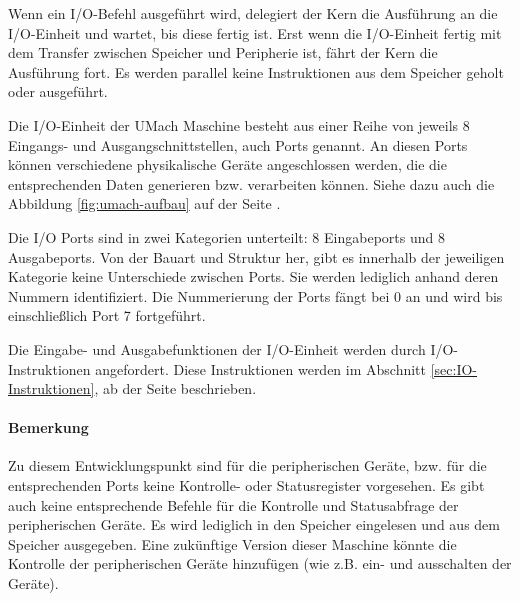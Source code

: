 Wenn ein I/O-Befehl ausgeführt wird, delegiert der Kern die Ausführung an die
I/O-Einheit und wartet, bis diese fertig ist. Erst wenn die I/O-Einheit fertig
mit dem Transfer zwischen Speicher und Peripherie ist, fährt der Kern die
Ausführung fort. Es werden parallel keine Instruktionen aus dem
Speicher geholt oder ausgeführt.


Die I/O-Einheit der UMach Maschine besteht aus einer Reihe von jeweils 8
Eingangs- und Ausgangschnittstellen, auch Ports
genannt. An diesen Ports können verschiedene physikalische Geräte angeschlossen
werden, die die entsprechenden Daten generieren bzw. verarbeiten können. Siehe
dazu auch die Abbildung \ref{fig:umach-aufbau} auf der Seite
\pageref{fig:umach-aufbau}.


Die I/O Ports sind in zwei Kategorien unterteilt: 8 Eingabeports und 8
Ausgabeports. Von der Bauart und Struktur her, gibt es innerhalb der jeweiligen
Kategorie keine Unterschiede zwischen Ports. Sie werden lediglich anhand deren
Nummern identifiziert. Die Nummerierung der Ports fängt bei 0 an und wird bis
einschließlich Port 7 fortgeführt. 


Die Eingabe- und Ausgabefunktionen der I/O-Einheit werden durch
I/O-Instruktionen angefordert. Diese Instruktionen werden im Abschnitt
\ref{sec:IO-Instruktionen}, ab der Seite \pageref{sec:IO-Instruktionen}
beschrieben.


\paragraph{Bemerkung}
Zu diesem Entwicklungspunkt sind für die peripherischen Geräte, bzw. für die
entsprechenden Ports keine Kontrolle- oder Statusregister vorgesehen. Es gibt
auch keine entsprechende Befehle für die Kontrolle und Statusabfrage der
peripherischen Geräte. Es wird lediglich in den Speicher eingelesen und aus dem
Speicher ausgegeben. Eine zukünftige Version dieser Maschine könnte die
Kontrolle der peripherischen Geräte hinzufügen (wie z.B. ein- und ausschalten
der Geräte).

